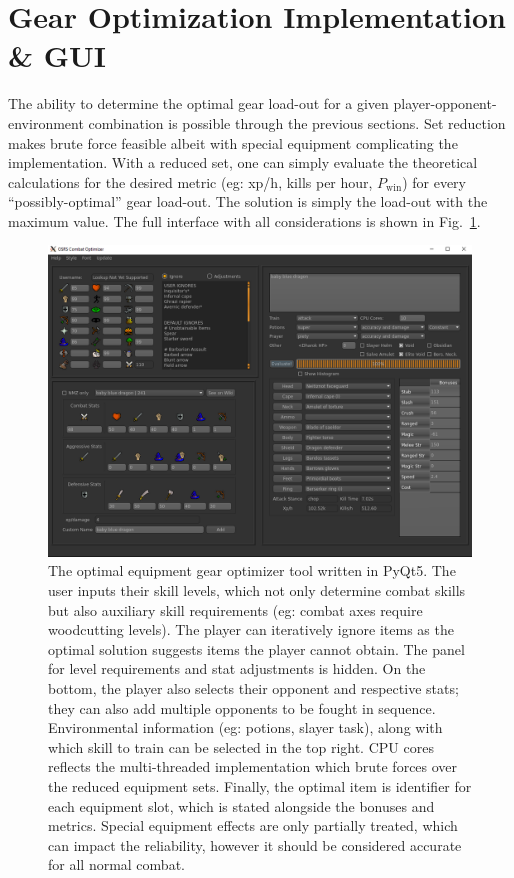 


\section{Gear Optimization Implementation \& GUI}
	The ability to determine the optimal gear load-out for a given player-opponent-environment combination is possible through the previous sections. Set reduction makes brute force feasible albeit with special equipment complicating the implementation. With a reduced set, one can simply evaluate the theoretical calculations for the desired metric (eg: xp/h, kills per hour, $P_\text{win}$) for every ``possibly-optimal'' gear load-out. The solution is simply the load-out with the maximum value. The full interface with all considerations is shown in Fig.~\ref{fig:gear_optimizer}.

	\begin{figure}
		\centering
		\includegraphics[width=\linewidth]{img/combat/gear_optimizer.png}
		\caption{
			The optimal equipment gear optimizer tool written in PyQt5. The user inputs their skill levels, which not only determine combat skills but also auxiliary skill requirements (eg: combat axes require woodcutting levels). The player can iteratively ignore items as the optimal solution suggests items the player cannot obtain. The panel for level requirements and stat adjustments is hidden. On the bottom, the player also selects their opponent and respective stats; they can also add multiple opponents to be fought in sequence. Environmental information (eg: potions, slayer task), along with which skill to train can be selected in the top right. CPU cores reflects the multi-threaded implementation which brute forces over the reduced equipment sets. Finally, the optimal item is identifier for each equipment slot, which is stated alongside the bonuses and metrics. Special equipment effects are only partially treated, which can impact the reliability, however it should be considered accurate for all normal combat.
		}
		\label{fig:gear_optimizer}
	\end{figure}

